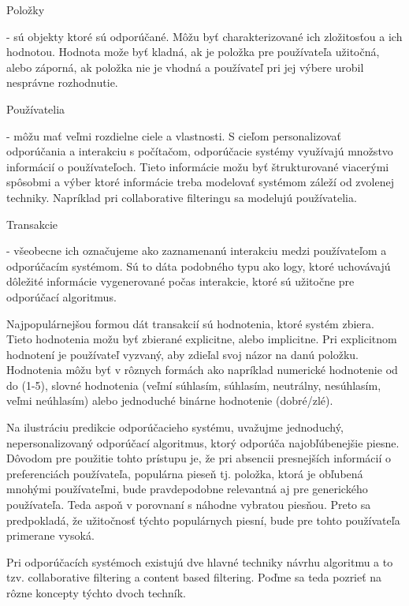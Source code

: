  \begin{itemize}[leftmargin=*]
{\bf \item Položky} - sú objekty ktoré sú odporúčané. Môžu byť charakterizované ich zložitosťou a ich hodnotou. Hodnota može byť kladná, ak je položka pre používateľa užitočná, alebo záporná, ak položka nie je vhodná a používateľ pri jej výbere urobil nesprávne rozhodnutie.
{\bf \item Používatelia} - môžu mať veľmi rozdielne ciele a vlastnosti. S cieľom personalizovať odporúčania a interakciu s počítačom, odporúčacie systémy využívajú množstvo informácií o používateľoch. Tieto informácie možu byť štrukturované viacerými spôsobmi a výber ktoré informácie treba modelovať systémom záleží od zvolenej techniky. Napríklad pri collaborative filteringu sa modelujú používatelia.
{\bf \item Transakcie} - všeobecne ich označujeme ako zaznamenanú interakciu medzi používateľom a odporúčacím systémom. Sú to dáta podobného typu ako logy, ktoré uchovávajú dôležité informácie vygenerované počas interakcie, ktoré sú užitočne pre odporúčací algoritmus.

Najpopulárnejšou formou dát transakcií sú hodnotenia, ktoré systém zbiera. Tieto hodnotenia možu byť zbierané explicitne, alebo implicitne. Pri explicitnom hodnotení je používateľ vyzvaný, aby zdieľal svoj názor na danú položku. Hodnotenia môžu byť v rôznych formách ako napríklad numerické hodnotenie od do (1-5), slovné hodnotenia (veľmí súhlasím, súhlasím, neutrálny, nesúhlasím, veľmi neúhlasím) alebo jednoduché binárne hodnotenie (dobré/zlé).

\end{itemize} 
 
Na ilustráciu predikcie odporúčacieho systému, uvažujme jednoduchý, nepersonalizovaný odporúčací algoritmus, ktorý odporúča najobľúbenejšie piesne. Dôvodom pre použitie tohto prístupu je, že pri absencii presnejších informácií o preferenciách používateľa, populárna pieseň tj. položka, ktorá je obľubená mnohými používateľmi, bude pravdepodobne relevantná aj pre generického používateľa. Teda aspoň v porovnaní s náhodne vybratou piesňou. Preto sa predpokladá, že užitočnosť týchto populárnych piesní, bude pre tohto používateľa primerane vysoká.

  Pri odporúčacích systémoch existujú dve hlavné techniky návrhu algoritmu a to tzv. collaborative filtering a content based filtering. Poďme sa teda pozrieť na rôzne koncepty týchto dvoch techník. \\

